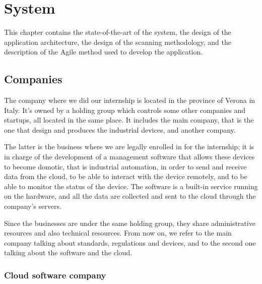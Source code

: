 \chapter{System}

This chapter contains the state-of-the-art of the system, the design of the application architecture, the design of the scanning methodology, and the description of the Agile method used to develop the application.



\section{Companies}

The company where we did our internship is located in the province of Verona in Italy. It's owned by a holding group which controls some other companies and startups, all located in the same place. It includes the main company, that is the one that design and produces the industrial devices, and another company. 

The latter is the business where we are legally enrolled in for the internship; it is in charge of the development of a management software that allows these devices to become domotic, that is industrial automation, in order to send and receive data from the cloud, to be able to interact with the device remotely, and to be able to monitor the status of the device. The software is a built-in service running on the hardware, and all the data are collected and sent to the cloud through the company's servers.

Since the businesses are under the same holding group, they share administrative resources and also technical resources. From now on, we refer to the main company talking about standards, regulations and devices, and to the second one talking about the software and the cloud.

\subsection{Cloud software company}

